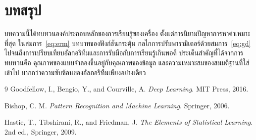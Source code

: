 \documentclass[12pt, a4paper]{article}
\begin{document}
\section{บทสรุป}

บทความนี้ได้ทบทวนองค์ประกอบหลักของการเรียนรู้ของเครื่อง ตั้งแต่การนิยามปัญหาการหาค่าเหมาะที่สุด
ในสมการ~\eqref{eq:erm} บทบาทของฟังก์ชันกระตุ้น กลไกการปรับพารามิเตอร์ด้วยสมการ~\eqref{eq:gd}
ไปจนถึงการเปรียบเทียบอัลกอริทึมและการรับมือกับการเรียนรู้เกินพอดี
ประเด็นสำคัญที่ได้จากการทบทวนคือ คุณภาพของแบบจำลองขึ้นอยู่กับคุณภาพของข้อมูล
และความเหมาะสมของสมมติฐานที่ใส่เข้าไป มากกว่าความซับซ้อนของอัลกอริทึมเพียงอย่างเดียว

\begin{thebibliography}{9}
  Goodfellow, I., Bengio, Y., and Courville, A.
  \emph{Deep Learning}. MIT Press, 2016.

  Bishop, C. M.
  \emph{Pattern Recognition and Machine Learning}. Springer, 2006.

  Hastie, T., Tibshirani, R., and Friedman, J.
  \emph{The Elements of Statistical Learning}. 2nd ed., Springer, 2009.
\end{thebibliography}
\end{document}
